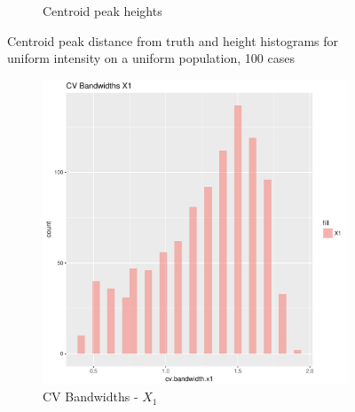 \begin{figure}[htbp]
\begin{subfigure}[b]{0.45\textwidth}
    \caption{Centroid peak heights}
    \end{subfigure}
    \caption[Centroids: uniform on uniform]{Centroid peak distance from truth and height histograms for uniform intensity on a uniform population, 100 cases}
    \label{fig:centroids:template}
\end{figure}

\begin{figure}[htbp]
    \centering
    \begin{subfigure}[b]{0.45\textwidth}
    \includegraphics[width=\textwidth]{output/bandwidths-x1}
    \caption{CV Bandwidths - \(X_1\)}
    \end{subfigure}
    \begin{subfigure}[b]{0.45\textwidth}

\end{subfigure}
\end{figure}
